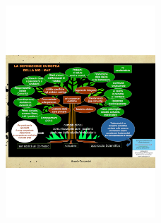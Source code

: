 \begin{figure}[!ht]
\centering
	\includegraphics[width=0.5\textwidth]{38/image8.png}
	\end{figure}
	
